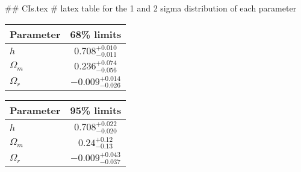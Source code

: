 ## CIs.tex
# latex table for the 1 and 2 sigma distribution of each parameter

\begin{tabular} { l  c}
 Parameter &  68\% limits\\
\hline
{\boldmath$h              $} & $0.708^{+0.010}_{-0.011}   $\\
{\boldmath$\Omega_m       $} & $0.236^{+0.074}_{-0.056}   $\\
{\boldmath$\Omega_r       $} & $-0.009^{+0.014}_{-0.026}  $\\
\hline
\end{tabular}

\begin{tabular} { l  c}
 Parameter &  95\% limits\\
\hline
{\boldmath$h              $} & $0.708^{+0.022}_{-0.020}   $\\
{\boldmath$\Omega_m       $} & $0.24^{+0.12}_{-0.13}      $\\
{\boldmath$\Omega_r       $} & $-0.009^{+0.043}_{-0.037}  $\\
\hline
\end{tabular}
